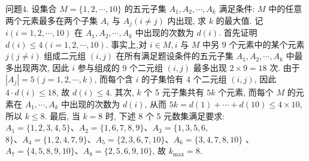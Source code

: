 问题4. 设集合 $M=\{1,2, \cdots, 10\}$ 的五元子集 $A_1, A_2, \cdots, A_k$ 满足条件: $M$ 中的任意两个元素最多在两个子集 $A_i$ 与 $A_j(i \neq j)$ 内出现, 求 $k$ 的最大值.
记 $i(i=1,2, \cdots, 10)$ 在 $A_1, A_2, \cdots, A_k$ 中出现的次数为 $d(i)$. 首先证明 $d(i) \leqslant 4(i=1,2, \cdots, 10)$. 事实上,对 $i \in M, i$ 与 $M$ 中另 9 个元素中的某个元素 $j(j \neq i)$ 组成二元组 $(i, j)$ 在所有满足题设条件的五元子集 $A_1,A_2, \cdots, A_k$ 中最多出现两次, 因此 $i$ 参与组成的 9 个二元组 $(i, j)$ 最多出现 $2 \times 9=18$ 次.
由于 $\left|A_j\right|=5(j=1,2, \cdots, k)$, 而每个含 $i$ 的子集恰有 4 个二元组 $(i, j)$, 因此 $4 \cdot d(i) \leqslant 18$, 故 $d(i) \leqslant 4$. 其次, $k$ 个 5 元子集共有 $5 k$ 个元素, 而每个 $M$ 的元素在 $A_1, \cdots, A_k$ 中出现的次数为 $d(i)$, 从而 $5 k= d(1)+\cdots+d(10) \leqslant 4 \times 10$, 所以 $k \leqslant 8$. 最后, 当 $k=8$ 时, 下述 8 个 5 元数集满足要求: $A_1=\{1,2,3,4,5\} 、 A_2=\{1,6,7,8,9\} 、 A_3=\{1,3,5,6$, $8\} 、 A_4=\{1,2,4,7,9\} 、 A_5=\{2,3,6,7,10\} 、 A_6=\{3,4,7,8,10\}$ 、 $A_7=\{4,5,8,9,10\} 、 A_8=\{2,5,6,9,10\}$, 故 $k_{\max }=8$.



